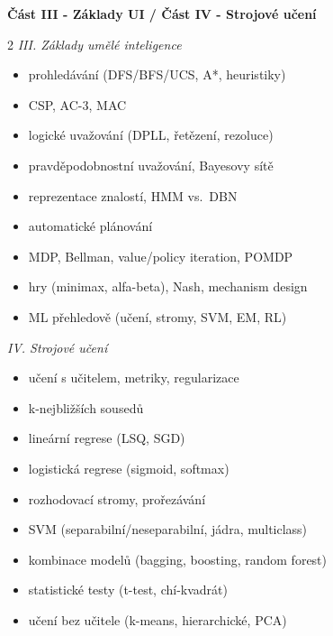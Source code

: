 \textbf{Část III - Základy UI \quad / \quad Část IV - Strojové učení}
\begin{multicols}{2}\small
\textit{III. Základy umělé inteligence}
\begin{itemize}[label=\checkmark,leftmargin=1.3em,itemsep=0pt]
  \item prohledávání (DFS/BFS/UCS, A*, heuristiky)
  \item CSP, AC-3, MAC
  \item logické uvažování (DPLL, řetězení, rezoluce)
  \item pravděpodobnostní uvažování, Bayesovy sítě
  \item reprezentace znalostí, HMM vs.\ DBN
  \item automatické plánování
  \item MDP, Bellman, value/policy iteration, POMDP
  \item hry (minimax, alfa-beta), Nash, mechanism design
  \item ML přehledově (učení, stromy, SVM, EM, RL)
\end{itemize}
\textit{IV. Strojové učení}
\begin{itemize}[label=\checkmark,leftmargin=1.3em,itemsep=0pt]
  \item učení s učitelem, metriky, regularizace
  \item k-nejbližších sousedů
  \item lineární regrese (LSQ, SGD)
  \item logistická regrese (sigmoid, softmax)
  \item rozhodovací stromy, prořezávání
  \item SVM (separabilní/neseparabilní, jádra, multiclass)
  \item kombinace modelů (bagging, boosting, random forest)
  \item statistické testy (t-test, chí-kvadrát)
  \item učení bez učitele (k-means, hierarchické, PCA)
\end{itemize}
\end{multicols}

